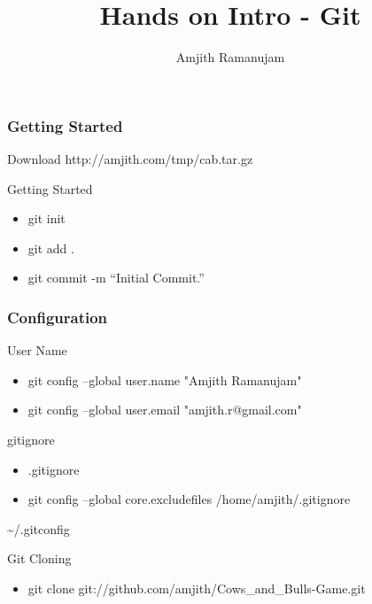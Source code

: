 \documentclass[10pt]{beamer}
\title{Hands on Intro - Git}
\author{Amjith Ramanujam}
\institute{twitter: amjith\_\\
blog: amjith.blogspot.com}
\date{}
\begin{document}
\begin{frame}
    \titlepage
\end{frame}

\begin{frame}
    \frametitle{Getting Started}
    Download http://amjith.com/tmp/cab.tar.gz
    \begin{block}{Getting Started}
        \begin{itemize}
            \item git init \\
            \item git add .\\
            \item git commit -m ``Initial Commit.''
        \end{itemize}
    \end{block}
\end{frame}

\begin{frame}
    \frametitle{Configuration}
    \begin{block}{User Name}
        \begin{itemize}
            \item git config --global user.name "Amjith Ramanujam"   \\
            \item git config --global user.email "amjith.r@gmail.com"\\
        \end{itemize}
    \end{block}
    \pause
    \begin{block}{gitignore}
        \begin{itemize}
            \item .gitignore\\
            \item git config --global core.excludefiles /home/amjith/.gitignore\\
        \end{itemize}
    \end{block}
    \textasciitilde/.gitconfig
    \pause
    \begin{block}{Git Cloning}
        \begin{itemize}
		\item git clone git://github.com/amjith/Cows\_and\_Bulls-Game.git
        \end{itemize}
    \end{block}
\end{frame}
\end{document}
